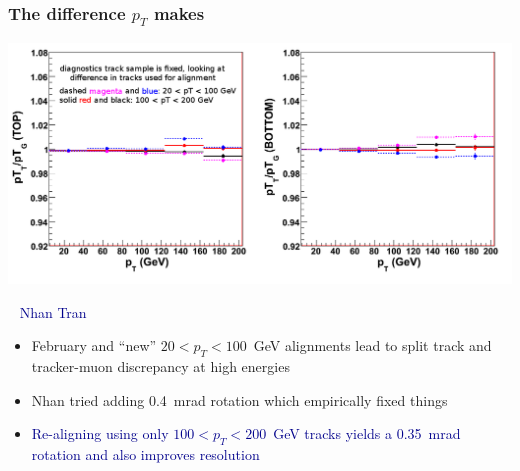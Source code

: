 \documentclass[compress]{beamer}
\begin{document}
\begin{frame}
\frametitle{The difference $p_T$ makes}

\vspace{0.3 cm}
\mbox{\hspace{-0.75 cm}}\includegraphics[width=1.15\linewidth]{plot_pTRatioVspT.png}

\vspace{-0.75 cm}
\mbox{ } \hfill \textcolor{darkblue}{\scriptsize Nhan Tran \hspace{-0.5 cm}}

\vspace{-0.15 cm}
\begin{itemize}
\item February and ``new'' $20 < p_T < 100$~GeV alignments lead to split track and tracker-muon discrepancy at high energies
\item Nhan tried adding 0.4~mrad rotation which empirically fixed things
\item \textcolor{darkblue}{Re-aligning using only $100 < p_T < 200$~GeV tracks yields a 0.35~mrad rotation and also improves resolution}
\end{itemize}
\end{frame}
\end{document}
